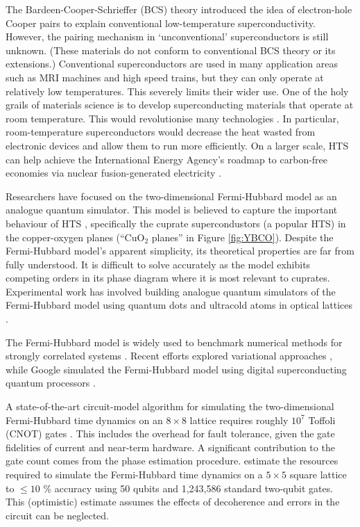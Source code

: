\documentclass[10pt]{iopart}
\begin{document}
The Bardeen-Cooper-Schrieffer (BCS) theory \cite{Bardeen1957,Bardeen1957a} introduced the idea of electron-hole Cooper pairs to explain conventional low-temperature superconductivity. However, the pairing mechanism in `unconventional' superconductors is still unknown. (These materials do not conform to conventional BCS theory or its extensions.) Conventional superconductors are used in many application areas such as MRI machines and high speed trains, but they can only operate at relatively low temperatures. This severely limits their wider use. One of the holy grails of materials science is to develop superconducting materials that operate at room temperature. This would revolutionise many technologies \cite{Lilia2022}. In particular, room-temperature superconductors would decrease the heat wasted from electronic devices and allow them to run more efficiently. On a larger scale, HTS can help achieve the International Energy Agency's roadmap to carbon-free economies \cite{IEA2021} via nuclear fusion-generated electricity \cite{Ball2021}.

Researchers have focused on the two-dimensional Fermi-Hubbard model as an analogue quantum simulator. This model is believed to capture the important behaviour of HTS \cite{Dagotto1994,Fradkin2015}, specifically the cuprate supercondustors (a popular HTS) in the copper-oxygen planes (``CuO$_2$ planes'' in Figure \ref{fig:YBCO}). Despite the Fermi-Hubbard model's apparent simplicity, its theoretical properties are far from fully understood. It is difficult to solve accurately as the model exhibits competing orders in its phase diagram where it is most relevant to cuprates. Experimental work has involved building analogue quantum simulators of the Fermi-Hubbard model using quantum dots \cite{Hensgens2017,Wang2022} and ultracold atoms in optical lattices \cite{Mazurenko2017,Hirthe2023}.

The Fermi-Hubbard model is widely used to benchmark numerical methods for strongly correlated systems \cite{SimonsCollaboration2015}. Recent efforts explored variational approaches \cite{Cade2020,Cai2020,Stanisic2022}, while Google simulated the Fermi-Hubbard model using digital superconducting quantum processors \cite{Google2020}. 

A state-of-the-art circuit-model algorithm for simulating the two-dimensional Fermi-Hubbard time dynamics on an $8 \times 8$ lattice requires roughly $10^7$ Toffoli (CNOT) gates \cite{Kivlichan2020}. This includes the overhead for fault tolerance, given the gate fidelities of current and near-term hardware. A significant contribution to the gate count comes from the phase estimation procedure. \citeauthor{Clinton2021} \cite{Clinton2021} estimate the resources required to simulate the Fermi-Hubbard time dynamics on a $5 \times 5$ square lattice to $\leq 10$ \% accuracy using 50 qubits and 1,243,586 standard two-qubit gates. This (optimistic) estimate assumes the effects of decoherence and errors in the circuit can be neglected.
\end{document}
